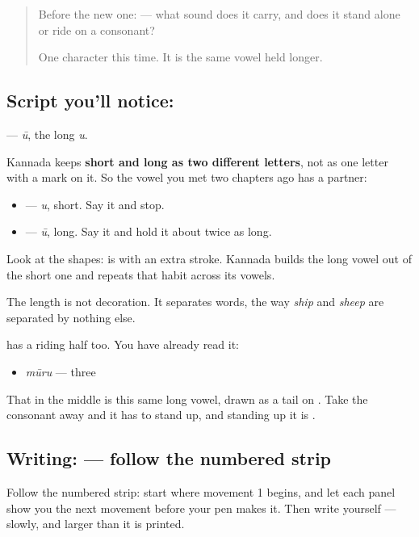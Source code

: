 \begin{quote}
Before the new one:  — what sound does it carry, and does it stand alone or ride on a consonant?

One character this time. It is the same vowel held longer.
\end{quote}

\subsection*{Script you'll notice: }
\textbf{} — \emph{ū}, the long \emph{u}.

Kannada keeps \textbf{short and long as two different letters}, not as one letter with a mark on it. So the vowel you met two chapters ago has a partner:

\begin{itemize}
\raggedright
  \item \textbf{} — \emph{u}, short. Say it and stop.
  \item \textbf{} — \emph{ū}, long. Say it and hold it about twice as long.
\end{itemize}

Look at the shapes: \textbf{} is \textbf{} with an extra stroke. Kannada builds the long vowel out of the short one and repeats that habit across its vowels.

The length is not decoration. It separates words, the way \emph{ship} and \emph{sheep} are separated by nothing else.

\textbf{} has a riding half too. You have already read it:

\begin{itemize}
\raggedright
  \item \textbf{} \emph{mūru} — three
\end{itemize}

That \textbf{} in the middle is this same long vowel, drawn as a tail on \textbf{}. Take the consonant away and it has to stand up, and standing up it is \textbf{}.

\subsection*{Writing:  — follow the numbered strip}

Follow the numbered strip: start where movement 1 begins, and let each panel show you the next movement before your pen makes it. Then write  yourself — slowly, and larger than it is printed.

